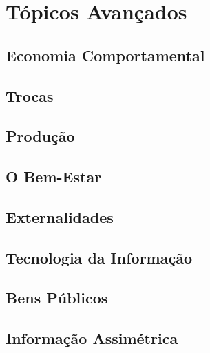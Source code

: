 \documentclass[a4paper,11pt,oneside]{book}
\theoremstyle{definition}
\theoremstyle{break}
\begin{document}
\part{Tópicos Avançados}

\chapter{Economia Comportamental}

\chapter{Trocas}

\chapter{Produção}

\chapter{O Bem-Estar}

\chapter{Externalidades}

\chapter{Tecnologia da Informação}

\chapter{Bens Públicos}

\chapter{Informação Assimétrica}
\end{document}
